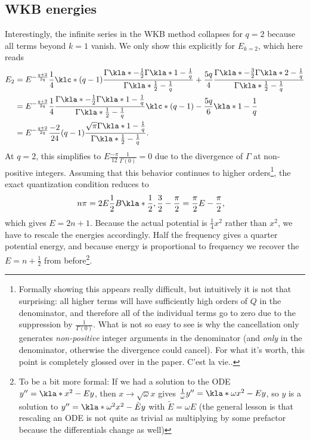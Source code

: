 \documentclass[english, parskip=full]{scrartcl}
\begin{document}
\subsection{WKB energies}
Interestingly, the infinite series in the WKB method collapses for $q=2$ because all terms beyond $k=1$ vanish.
We only show this explicitly for $E_{k=2}$, which here reads
\begin{align}
E_2&= E^{-\frac{q+2}{2q}} \frac{1}{4} \klc*{(q-1) \frac{\Gamma\kla*{-\frac{1}{2}}\Gamma\kla*{1 - \frac{1}{q}}}{\Gamma\kla*{\frac{1}{2} - \frac{1}{q}}} + \frac{5q}{4} \frac{\Gamma\kla*{-\frac{3}{2}}\Gamma\kla*{2 - \frac{1}{q}}}{\Gamma\kla*{\frac{1}{2} - \frac{1}{q}}}}\\
&= E^{-\frac{q+2}{2q}} \frac{1}{4} \frac{\Gamma\kla*{-\frac{1}{2}}\Gamma\kla*{1 - \frac{1}{q}}}{\Gamma\kla*{\frac{1}{2} - \frac{1}{q}}} \klc*{(q-1) - \frac{5q}{6} \kla*{1 - \frac{1}{q}}} \\
&= E^{-\frac{q+2}{2q}} \frac{-2}{24}(q-1) \frac{\sqrt{\pi}\Gamma\kla*{1 - \frac{1}{q}}}{\Gamma\kla*{\frac{1}{2} - \frac{1}{q}}}.
\end{align}
At $q=2$, this simplifies to $E\frac{-\pi}{12} \frac{1}{\Gamma(0)} = 0$ due to the divergence of $\Gamma$ at non-positive integers.
Assuming that this behavior continues to higher orders\footnote{Formally showing this appears really difficult, but intuitively it is not that surprising: all higher terms will have sufficiently high orders of $Q$ in the denominator, and therefore all of the individual terms go to zero due to the suppression by $\frac{1}{\Gamma(0)}$. What is not so easy to see is why the cancellation only generates \emph{non-positive} integer arguments in the denominator (and \emph{only} in the denominator, otherwise the divergence could cancel). For what it's worth, this point is completely glossed over in the paper. C'est la vie..}, the exact quantization condition reduces to
\begin{align}
n\pi &= 2E \frac{1}{2} B\kla*{\frac{1}{2},\frac{3}{2}} - \frac{\pi}{2} = \frac{\pi}{2} E - \frac{\pi}{2},
\end{align}
which gives $E = 2n+1$.
Because the actual potential is $\frac{1}{4}x^2$ rather than $x^2$, we have to rescale the energies accordingly.
Half the frequency gives a quarter potential energy, and because energy is proportional to frequency we recover the $E=n+\frac{1}{2}$ from before\footnote{To be a bit more formal: If we had a solution to the ODE $y''=\kla*{x^2-E}y$, then $x\rightarrow \sqrt{\omega} x$ gives $\frac{1}{\omega} y'' = \kla*{\omega x^2-E}y$, so $y$ is a solution to $y''=\kla*{\omega^2x^2-\tilde{E}}y$ with $\tilde{E}=\omega E$ (the general lesson is that rescaling an ODE is not quite as trivial as multiplying by some prefactor because the differentials change as well)}.
\end{document}
